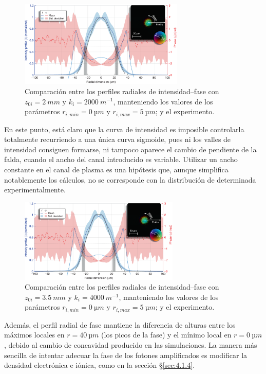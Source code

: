\begin{figure}[htbp]
  \centering
  \includegraphics[width=0.7\textwidth]{Figuras/ch4_cmp21.png}
  \caption{Comparación entre los perfiles radiales de intensidad--fase con $z_{0i}=\qty{2}{mm}$ y $k_{i}=\qty{2000}{m^{-1}}$, manteniendo los valores de los parámetros $r_{i,min}=\qty{0}{µm}$ y $r_{i,max}=\qty{5}{µm}$; y el experimento.}
  \label{fig:4.14}
\end{figure}

En este punto, está claro que la curva de intensidad es imposible controlarla totalmente recurriendo a una única curva sigmoide, pues ni los valles de intensidad consiguen formarse, ni tampoco aparece el cambio de pendiente de la falda, cuando el ancho del canal introducido es variable. Utilizar un ancho constante en el canal de plasma es una hipótesis que, aunque simplifica notablemente los cálculos, no se corresponde con la distribución de  determinada experimentalmente\autocite{Tuitje2020}.

\begin{figure}[htbp]
  \centering
  \includegraphics[width=0.68\textwidth]{Figuras/ch4_cmp22.png}
  \caption{Comparación entre los perfiles radiales de intensidad--fase con $z_{0i}=\qty{3.5}{mm}$ y $k_{i}=\qty{4000}{m^{-1}}$, manteniendo los valores de los parámetros $r_{i,min}=\qty{0}{µm}$ y $r_{i,max}=\qty{5}{µm}$; y el experimento.}
  \label{fig:4.15}
\end{figure}

Además, el perfil radial de fase mantiene la diferencia de alturas entre los máximos locales en $r=\qty{40}{µm}$ (los picos de la fase) y el mínimo local en $r=\qty{0}{µm}$, debido al cambio de concavidad producido en las simulaciones. La manera más sencilla de intentar adecuar la fase de los fotones amplificados es modificar la densidad electrónica e iónica, como en la sección \S\ref{sec:4.1.4}.

